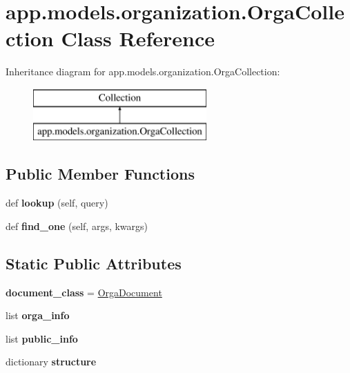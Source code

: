 \hypertarget{classapp_1_1models_1_1organization_1_1_orga_collection}{}\section{app.\+models.\+organization.\+Orga\+Collection Class Reference}
\label{classapp_1_1models_1_1organization_1_1_orga_collection}
Inheritance diagram for app.\+models.\+organization.\+Orga\+Collection\+:\begin{figure}[H]
\begin{center}
\leavevmode
\includegraphics[height=2.000000cm]{classapp_1_1models_1_1organization_1_1_orga_collection}
\end{center}
\end{figure}
\subsection*{Public Member Functions}
\begin{DoxyCompactItemize}
\item 
\mbox{\label{classapp_1_1models_1_1organization_1_1_orga_collection_a16ea08d94129c2a12b3aa8a3b2b8f315}} 
def {\bfseries lookup} (self, query)
\item 
\mbox{\label{classapp_1_1models_1_1organization_1_1_orga_collection_a9f2a5458b3051b4fbb7fd54f2d133efa}} 
def {\bfseries find\+\_\+one} (self, args, kwargs)
\end{DoxyCompactItemize}
\subsection*{Static Public Attributes}
\begin{DoxyCompactItemize}
\item 
\mbox{\label{classapp_1_1models_1_1organization_1_1_orga_collection_a34db3001efbf29378b5eb826f97ff728}} 
{\bfseries document\+\_\+class} = \hyperlink{classapp_1_1models_1_1organization_1_1_orga_document}{Orga\+Document}
\item 
list {\bfseries orga\+\_\+info}
\item 
list {\bfseries public\+\_\+info}
\item 
dictionary {\bfseries structure}
\end{DoxyCompactItemize}


